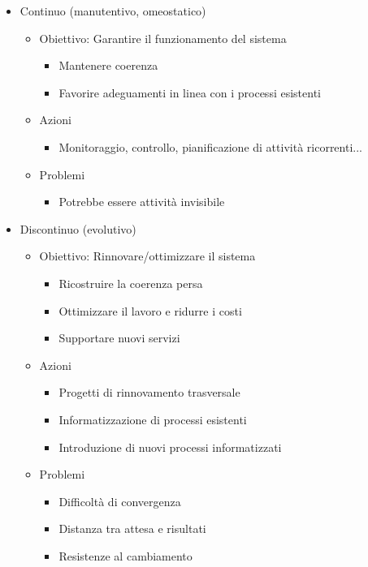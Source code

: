 \begin{itemize}
  \item
  Continuo (manutentivo, omeostatico)

  \begin{itemize}
    \item Obiettivo: Garantire il funzionamento del sistema
    \begin{itemize}
      \item
      Mantenere coerenza
      \item
      Favorire adeguamenti in linea con i processi esistenti
    \end{itemize}
    \item
    Azioni
    \begin{itemize}
      \item Monitoraggio, controllo, pianificazione di attivit\`a ricorrenti...
    \end{itemize}
    \item
    Problemi
    \begin{itemize}
      \item Potrebbe essere attivit\`a invisibile
    \end{itemize}
  \end{itemize}

  \item
  Discontinuo (evolutivo)

  \begin{itemize}
    \item
    Obiettivo: Rinnovare/ottimizzare il sistema
    \begin{itemize}
      \item
      Ricostruire la coerenza persa
      \item
      Ottimizzare il lavoro e ridurre i costi
      \item
      Supportare nuovi servizi
    \end{itemize}

    \item
     Azioni
     \begin{itemize}
       \item
       Progetti di rinnovamento trasversale
       \item
       Informatizzazione di processi esistenti
       \item
       Introduzione di nuovi processi informatizzati
     \end{itemize}

     \item
     Problemi
     \begin{itemize}
       \item
       Difficolt\`a di convergenza
       \item
       Distanza tra attesa e risultati
       \item
       Resistenze al cambiamento
     \end{itemize}
  \end{itemize}
\end{itemize}


